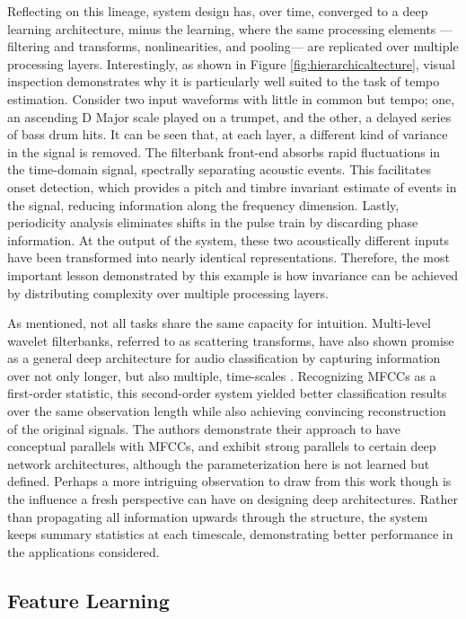 Reflecting on this lineage, system design has, over time, converged to a deep learning architecture, minus the learning, where the same processing elements ---filtering and transforms, nonlinearities, and pooling--- are replicated over multiple processing layers.
Interestingly, as shown in Figure \ref{fig:hierarchicaltecture}, visual inspection demonstrates why it is particularly well suited to the task of tempo estimation.
Consider two input waveforms with little in common but tempo; one, an ascending D Major scale played on a trumpet, and the other, a delayed series of bass drum hits.
It can be seen that, at each layer, a different kind of variance in the signal is removed.
The filterbank front-end absorbs rapid fluctuations in the time-domain signal, spectrally separating acoustic events.
This facilitates onset detection, which provides a pitch and timbre invariant estimate of events in the signal, reducing information along the frequency dimension.
Lastly, periodicity analysis eliminates shifts in the pulse train by discarding phase information.
At the output of the system, these two acoustically different inputs have been transformed into nearly identical representations.
Therefore, the most important lesson demonstrated by this example is how invariance can be achieved by distributing complexity over multiple processing layers.

As mentioned, not all tasks share the same capacity for intuition.
Multi-level wavelet filterbanks, referred to as scattering transforms, have also shown promise as a general deep architecture for audio classification by capturing information over not only longer, but also multiple, time-scales \cite{Anden2011Multiscale}.
Recognizing MFCCs as a first-order statistic, this second-order system yielded better classification results over the same observation length while also achieving convincing reconstruction of the original signals.
The authors demonstrate their approach to have conceptual parallels with MFCCs, and exhibit strong parallels to certain deep network architectures, although the parameterization here is not learned but defined.
Perhaps a more intriguing observation to draw from this work though is the influence a fresh perspective can have on designing deep architectures.
Rather than propagating all information upwards through the structure, the system keeps summary statistics at each timescale, demonstrating better performance in the applications considered.


\subsection{Feature Learning}
\label{subsec:feature_learning}

